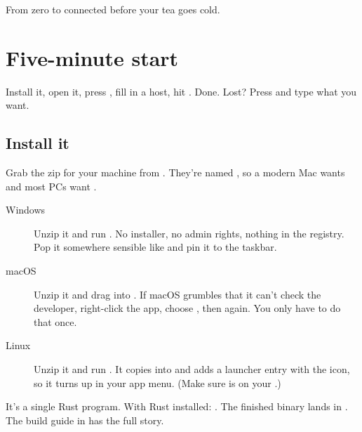   {From zero to connected before your tea goes cold.}
  {
   }

\chapter{Five-minute start}\label{ch:start}

\begin{tldr}
Install it, open it, press , fill in a host, hit . Done.
Lost? Press  and type what you want.
\end{tldr}

\section{Install it}

Grab the zip for your machine from . They're named
, so a modern Mac wants  and most PCs want .

\begin{description}
  \item[\iDesktop\enspace Windows] Unzip it and run . No installer, no admin rights,
    nothing in the registry. Pop it somewhere sensible like  and pin it to the taskbar.
  \item[\iDesktop\enspace macOS] Unzip it and drag  into . If macOS
    grumbles that it can't check the developer, right-click the app, choose , then  again. You only
    have to do that once.
  \item[\iDesktop\enspace Linux] Unzip it and run . It copies  into
     and adds a launcher entry with the icon, so it turns up in your app menu.
    (Make sure  is on your .)
\end{description}

\begin{sidequest}
It's a single Rust program. With Rust installed: . The finished binary lands in
. The build guide in  has the full story.
\end{sidequest}

